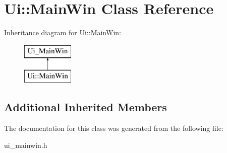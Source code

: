 \hypertarget{class_ui_1_1_main_win}{}\section{Ui\+:\+:Main\+Win Class Reference}
\label{class_ui_1_1_main_win}
Inheritance diagram for Ui\+:\+:Main\+Win\+:\begin{figure}[H]
\begin{center}
\leavevmode
\includegraphics[height=2.000000cm]{class_ui_1_1_main_win}
\end{center}
\end{figure}
\subsection*{Additional Inherited Members}


The documentation for this class was generated from the following file\+:\begin{DoxyCompactItemize}
\item 
ui\+\_\+mainwin.\+h\end{DoxyCompactItemize}
